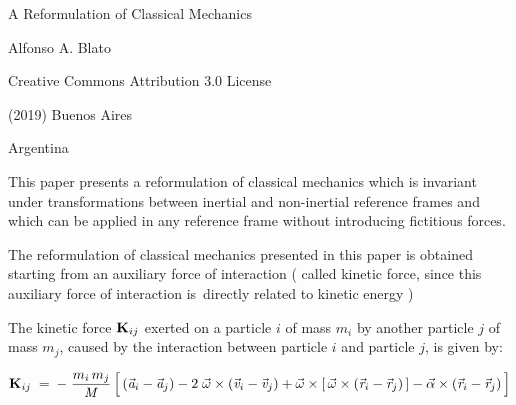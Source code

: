 \documentclass[10pt]{article}
\begin{document}
\begin{center}

{\LARGE A Reformulation of Classical Mechanics}

\bigskip \medskip

{\large Alfonso A. Blato}

\bigskip \medskip

\small

Creative Commons Attribution 3.0 License

\smallskip

(2019) Buenos Aires

\smallskip

Argentina

\smallskip

\bigskip \medskip

\parbox{99.00mm}{This paper presents a reformulation of classical mechanics which is invariant under transformations between inertial and non-inertial \hbox {reference} frames and which can be applied in any reference frame \hbox {without} introducing fictitious forces.}

\end{center}

\normalsize

\vspace{-1.50em}

\par {}

\par \bigskip \noindent The reformulation of classical mechanics presented in this paper is obtained starting from an auxiliary force of interaction ( called kinetic force, since this auxiliary force of interaction \hbox {is directly} related to kinetic energy )

\par \bigskip\smallskip \noindent The kinetic force ${\mathbf{K}}_{\hspace{+0.009em}ij}$ exerted on a particle $i$ of mass $m_i$ by another particle $j$ of mass $m_j$, caused by the interaction between particle $i$ and particle $j$, is given by:

\par \bigskip ${\mathbf{K}}_{\hspace{+0.009em}ij} \;=\: - \; \dfrac{m_i \, m_j}{\mathit{M}} \, \Big[ \, ({\vec{\mathit{a}}}_{i} - {\vec{\mathit{a}}}_{j}) - 2 \; {\vec{\omega}} \times ({\vec{\mathit{v}}}_{i} - {\vec{\mathit{v}}}_{j}) + {\vec{\omega}} \times [ \, {\vec{\omega}} \times ({\vec{\mathit{r}}}_{i} - {\vec{\mathit{r}}}_{j}) \, ] - {\vec{\alpha}} \times ({\vec{\mathit{r}}}_{i} - {\vec{\mathit{r}}}_{j}) \, \Big]$
\end{document}

